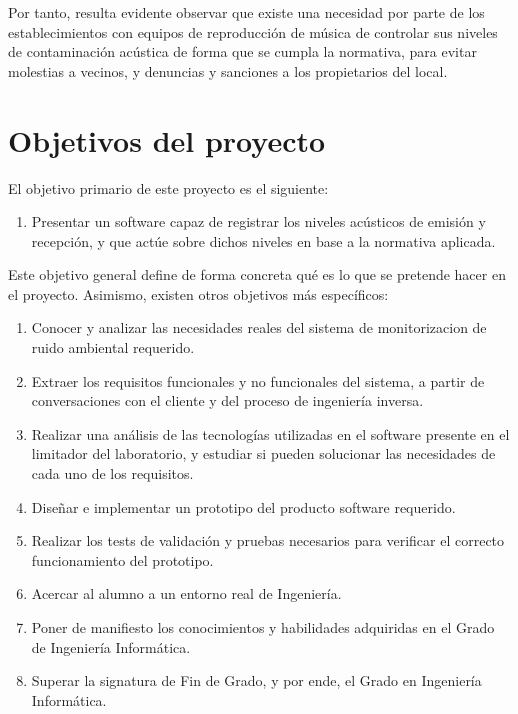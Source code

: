 Por tanto, resulta evidente observar que existe una necesidad por parte de los establecimientos con equipos de reproducción de música de controlar sus niveles de contaminación acústica de forma que se cumpla la normativa, para evitar molestias a vecinos, y denuncias y sanciones a los propietarios del local.


\section{Objetivos del proyecto}\label{sec:objetivos}

El objetivo primario de este proyecto es el siguiente:

\begin{enumerate}
    \item Presentar un software capaz de registrar los niveles acústicos de emisión y recepción, y que actúe sobre dichos niveles en base a la normativa aplicada.
\end{enumerate}

Este objetivo general define de forma concreta qué es lo que se pretende hacer en el proyecto. Asimismo, existen otros objetivos más específicos:

\begin{enumerate}

    \item Conocer y analizar las necesidades reales del sistema de monitorizacion de ruido ambiental requerido.

    \item Extraer los requisitos funcionales y no funcionales del sistema, a partir de conversaciones con el cliente y del proceso de ingeniería inversa.

    \item Realizar una análisis de las tecnologías utilizadas en el software presente en el limitador del laboratorio, y estudiar si pueden solucionar las necesidades de cada uno de los requisitos.

    \item Diseñar e implementar un prototipo del producto software requerido.

    \item Realizar los tests de validación y pruebas necesarios para verificar el correcto funcionamiento del prototipo.

    \item Acercar al alumno a un entorno real de Ingeniería.

    \item Poner de manifiesto los conocimientos y habilidades adquiridas en el Grado de Ingeniería Informática.

    \item Superar la signatura de Fin de Grado, y por ende, el Grado en Ingeniería Informática.
\end{enumerate}

